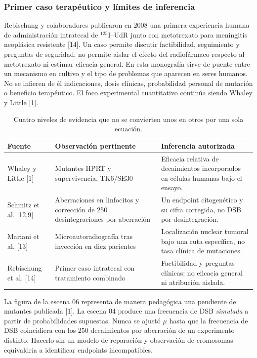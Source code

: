 \documentclass[11pt,a4paper,oneside]{article}
\begin{document}
\subsubsection{Primer caso terapéutico y límites de inferencia}
Rebischung y colaboradores publicaron en 2008 una primera experiencia
humana de administración intratecal de $^{125}$I--UdR junto con
metotrexato para meningitis neoplásica resistente [14]. Un caso permite
discutir factibilidad, seguimiento y preguntas de seguridad; no permite
aislar el efecto del radiofármaco respecto al metotrexato ni estimar
eficacia general. En esta monografía sirve de puente entre un mecanismo
en cultivo y el tipo de problemas que aparecen en seres humanos. No se
infieren de él indicaciones, dosis clínicas, probabilidad personal de
mutación o beneficio terapéutico. El foco experimental cuantitativo
continúa siendo Whaley y Little [1].

\begin{table}[htbp]\centering\small
\begin{tabularx}{\linewidth}{@{}p{.19\linewidth}p{.31\linewidth}X@{}}
\toprule Fuente & Observación pertinente & Inferencia autorizada \\\midrule
Whaley y Little [1] & Mutantes HPRT y supervivencia, TK6/SE30 & Eficacia relativa de decaimientos incorporados en células humanas bajo el ensayo. \\
Schmitz et al. [12,9] & Aberraciones en linfocitos y corrección de 250 desintegraciones por aberración & Un endpoint citogenético y su cifra corregida, no DSB por desintegración. \\
Mariani et al. [13] & Microautoradiografía tras inyección en diez pacientes & Localización nuclear tumoral bajo una ruta específica, no tasa clínica de mutaciones. \\
Rebischung et al. [14] & Primer caso intratecal con tratamiento combinado & Factibilidad y preguntas clínicas; no eficacia general ni atribución aislada. \\\bottomrule
\end{tabularx}
\caption{Cuatro niveles de evidencia que no se convierten unos en otros por una sola ecuación.}
\end{table}

La figura de la escena 06 representa de manera pedagógica una pendiente de
mutantes publicada [1]. La escena 04 produce una frecuencia de DSB
\emph{simulada} a partir de probabilidades supuestas. Nunca se ajustó
$\mu$ hasta que la frecuencia de DSB coincidiera con los 250 decaimientos
por aberración de un experimento distinto. Hacerlo sin un modelo de
reparación y observación de cromosomas equivaldría a identificar endpoints
incompatibles.
\end{document}
